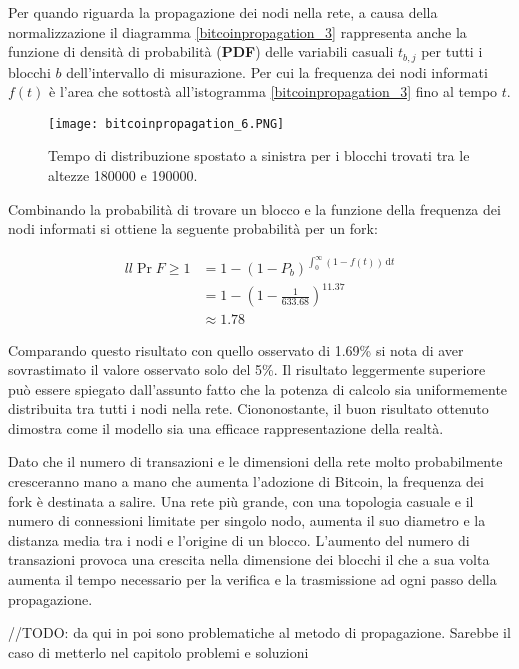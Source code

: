 Per quando riguarda la propagazione dei nodi nella rete, a causa della
normalizzazione il diagramma \ref{bitcoinpropagation_3} rappresenta
anche la funzione di densità di probabilità (\textbf{PDF}) delle
variabili casuali $t_{b,j}$ per tutti i blocchi $b$ dell'intervallo di
misurazione. Per cui la frequenza dei nodi informati $f(t)$ è l'area che
sottostà all'istogramma \ref{bitcoinpropagation_3} fino al tempo $t$.

\begin{figure}[htbp]
\centering
\texttt{[image: bitcoinpropagation\_6.PNG]}
\caption{Tempo di distribuzione spostato a sinistra per i blocchi
trovati tra le altezze 180000 e 190000.\label{bitcoinpropagation_6}}
\end{figure}

Combinando la probabilità di trovare un blocco e la funzione della
frequenza dei nodi informati si ottiene la seguente probabilità per un
fork:

\[
\begin{align}{ll}
    \Pr{F \geq 1} &= 1 - (1 - P_b)^{\int_{0}^{\infty} \! (1 - f(t)) \, \mathrm{d}t} \\
    &= 1 - (1 - \frac{1}{633.68})^11.37 \\
    &\approx 1.78%
\end{align}
\]

Comparando questo risultato con quello osservato di 1.69\% si nota di
aver sovrastimato il valore osservato solo del 5\%. Il risultato
leggermente superiore può essere spiegato dall'assunto fatto che la
potenza di calcolo sia uniformemente distribuita tra tutti i nodi nella
rete. Ciononostante, il buon risultato ottenuto dimostra come il modello
sia una efficace rappresentazione della realtà.

Dato che il numero di transazioni e le dimensioni della rete molto
probabilmente cresceranno mano a mano che aumenta l'adozione di Bitcoin,
la frequenza dei fork è destinata a salire. Una rete più grande, con una
topologia casuale e il numero di connessioni limitate per singolo nodo,
aumenta il suo diametro e la distanza media tra i nodi e l'origine di un
blocco. L'aumento del numero di transazioni provoca una crescita nella
dimensione dei blocchi il che a sua volta aumenta il tempo necessario
per la verifica e la trasmissione ad ogni passo della propagazione.

//TODO: da qui in poi sono problematiche al metodo di propagazione.
Sarebbe il caso di metterlo nel capitolo problemi e soluzioni

